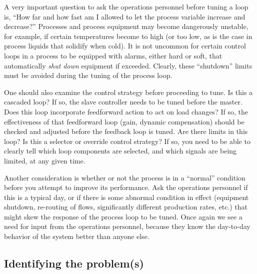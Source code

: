 A very important question to ask the operations personnel before tuning a loop is, ``How far and how fast am I allowed to let the process variable increase and decrease?''  Processes and process equipment may become dangerously unstable, for example, if certain temperatures become to high (or too low, as is the case in process liquids that solidify when cold).  It is not uncommon for certain control loops in a process to be equipped with alarms, either hard or soft, that automatically \textit{shut down} equipment if exceeded.  Clearly, these ``shutdown'' limits must be avoided during the tuning of the process loop.

One should also examine the control strategy before proceeding to tune.  Is this a cascaded loop?  If so, the slave controller needs to be tuned before the master.  Does this loop incorporate feedforward action to act on load changes?  If so, the effectiveness of that feedforward loop (gain, dynamic compensation) should be checked and adjusted before the feedback loop is tuned.  Are there limits in this loop?  Is this a selector or override control strategy?  If so, you need to be able to clearly tell which loop components are selected, and which signals are being limited, at any given time.

Another consideration is whether or not the process is in a ``normal'' condition before you attempt to improve its performance.  Ask the operations personnel if this is a typical day, or if there is some abnormal condition in effect (equipment shutdown, re-routing of flows, significantly different production rates, etc.) that might skew the response of the process loop to be tuned.  Once again we see a need for input from the operations personnel, because they know the day-to-day behavior of the system better than anyone else.







\filbreak
\subsection{Identifying the problem(s)}

